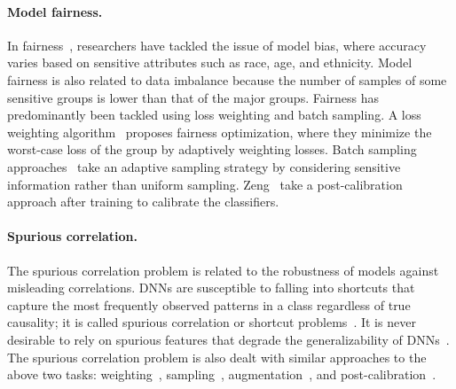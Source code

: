 \paragraph{Model fairness.} 
In fairness~\cite{narayanan2018translation, hardt2016equality, 10.1145/2783258.2783311}, researchers have tackled the issue of model bias, where accuracy varies based on 
sensitive attributes such as race, age, and ethnicity.
Model fairness is also related to data imbalance because the number of samples of some sensitive groups is lower than that of the major groups.
Fairness has predominantly been tackled using loss weighting and batch sampling.
A loss weighting algorithm~\cite{jung2023reweighting} proposes fairness optimization, where they minimize the worst-case loss of the group by adaptively weighting losses.
Batch sampling approaches~\cite{kamiran2012data, roh2020fairbatch} take an adaptive sampling strategy by considering sensitive information rather than uniform sampling.
Zeng~\etal\cite{zeng2022fair} take a post-calibration approach after training
to calibrate the classifiers.


\paragraph{Spurious correlation.}
The spurious correlation problem is related to the robustness of models against misleading correlations.
DNNs are susceptible to falling into shortcuts that capture the most frequently observed patterns in a class regardless of true causality;
it is called spurious correlation or shortcut problems~\cite{geirhos2020shortcut, scimeca2022iclr, kirichenko2023last}.
It is never desirable to rely on spurious features that degrade the generalizability of DNNs~\cite{sagawa2019distributionally, liu2015deep}.
The spurious correlation problem is also dealt with similar approaches to the above two tasks: weighting~\cite{sagawa2019distributionally,LfF,kim2022learning}, sampling~\cite{idrissi2022simple, sagawa2020investigation}, augmentation~\cite{lee2021learning,yao2022improving,hwang2022selecmix}, and post-calibration~\cite{liu2021just, kirichenko2023last, lee2022surgical}.


